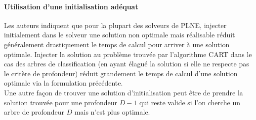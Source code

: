\documentclass[12pt]{report}
\begin{document}
\paragraph{Utilisation d'une initialisation adéquat}
Les auteurs indiquent que pour la plupart des solveurs de PLNE, injecter initialement dans le solveur une solution non optimale mais réalisable réduit généralement drastiquement le temps de calcul pour arriver à une solution optimale. Injecter la solution au problème trouvée par l'algorithme CART dans le cas des arbres de classification (en ayant élagué la solution si elle ne respecte pas le critère de profondeur) réduit grandement le temps de calcul d'une solution optimale via la formulation précédente.\\
Une autre façon de trouver une solution d'initialisation peut être de prendre la solution trouvée pour une profondeur \(D-1\) qui reste valide si l'on cherche un arbre de profondeur \(D\) mais n'est plus optimale. 
\end{document}
